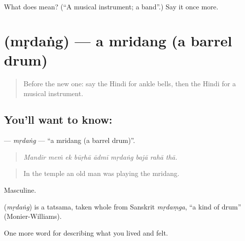 \begin{tcolorbox}[breakable,colback=teal!4,colframe=teal!35!black,title={Before you move on}]
What does  mean? (\textquotedblleft{}A musical instrument; a band\textquotedblright{}.) Say it once more.
\end{tcolorbox}
\section[\texorpdfstring{\hi{मृदंग} (mṛdaṅg)}{मृदंग (mṛdaṅg)}]{ (mṛdaṅg) — a mridang (a barrel drum)}

\label{lesson:HI-C531-mrdang}



\begin{quote}
Before the new one: say the Hindi for ankle bells, then the Hindi for a musical instrument.
\end{quote}

\subsection*{You'll want to know: }
\textbf{} — \emph{mṛdaṅg} — \textquotedblleft{}a mridang (a barrel drum)\textquotedblright{}.

\begin{quote}
        
\end{quote}

\begin{quote}
\emph{Mandir meṁ ek būṛhā ādmī mṛdaṅg bajā rahā thā.}
\end{quote}

\begin{quote}
In the temple an old man was playing the mridang.
\end{quote}

Masculine.

\begin{cousinweb}
\textbf{} (\emph{mṛdaṅg}) is a tatsama, taken whole from Sanskrit \emph{mṛdaṃga}, \textquotedblleft{}a kind of drum\textquotedblright{} (Monier-Williams).
\end{cousinweb}

\begin{grammarlens}[title={What you've built}]
One more word for describing what you lived and felt.
\end{grammarlens}


